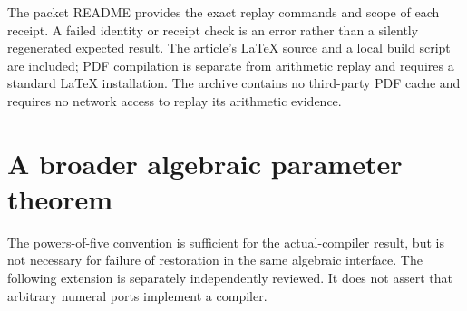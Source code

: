 \documentclass[11pt,letterpaper]{article}
\newcommand{\fupR}{0}
\renewcommand{\thesection}{\fupR.\arabic{section}}
\renewcommand{\theHsection}{\fupR.\arabic{section}}
\newcommand{\fupappendix}{%
  \setcounter{section}{0}%
  \renewcommand{\thesection}{\fupR.\Alph{section}}%
  \renewcommand{\theHsection}{\fupR.\Alph{section}}}
\theoremstyle{definition}\newtheorem{definition}[theorem]{Definition}
\theoremstyle{remark}\newtheorem{remark}[theorem]{Remark}
\begin{document}
The packet README provides the exact replay commands and scope of each receipt. A failed identity or receipt check is an error rather than a silently regenerated expected result. The article's LaTeX source and a local build script are included; PDF compilation is separate from arithmetic replay and requires a standard LaTeX installation. The archive contains no third-party PDF cache and requires no network access to replay its arithmetic evidence.

\fupappendix
\section{A broader algebraic parameter theorem}\label{fup:ir:app:generalized}
The powers-of-five convention is sufficient for the actual-compiler result, but is not necessary for failure of restoration in the same algebraic interface. The following extension is separately independently reviewed. It does not assert that arbitrary numeral ports implement a compiler.
\end{document}
